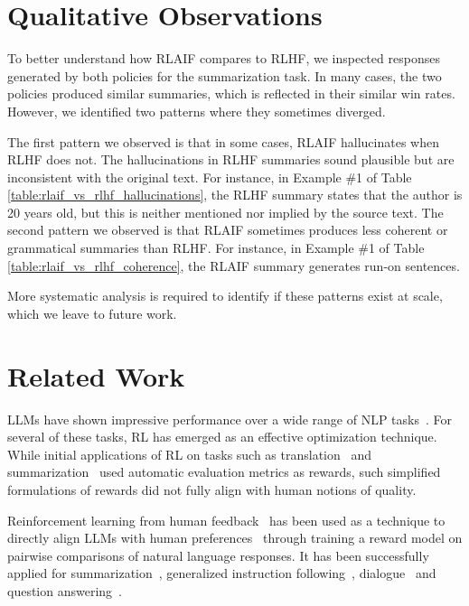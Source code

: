 \documentclass[11pt]{article}
\begin{document}
\section{Qualitative Observations}
\label{sec:analysis_rlaif_vs_rlhf}

To better understand how RLAIF compares to RLHF, we inspected responses generated by both policies for the summarization task. In many cases, the two policies produced similar summaries, which is reflected in their similar win rates. However, we identified two patterns where they sometimes diverged.

The first pattern we observed is that in some cases, RLAIF hallucinates when RLHF does not. The hallucinations in RLHF summaries sound plausible but are inconsistent with the original text. For instance, in Example \#1 of Table \ref{table:rlaif_vs_rlhf_hallucinations}, the RLHF summary states that the author is 20 years old, but this is neither mentioned nor implied by the source text. The second pattern we observed is that RLAIF sometimes produces less coherent or grammatical summaries than RLHF. For instance, in Example \#1 of Table \ref{table:rlaif_vs_rlhf_coherence}, the RLAIF summary generates run-on sentences.

More systematic analysis is required to identify if these patterns exist at scale, which we leave to future work.



\section{Related Work}
LLMs have shown impressive performance over a wide range of NLP tasks~\citep{brown2020language,thoppilan2022lamda,chowdhery2022palm,palm2,openai2023gpt4}. For several of these tasks, RL has emerged as an effective optimization technique. While initial applications of RL on tasks such as translation~\citep{wu2016google,wu2018study} and summarization~\citep{gao2019reward,wu2018learning} used automatic evaluation metrics as rewards, such simplified formulations of rewards did not fully align with human notions of quality. 

Reinforcement learning from human feedback~\citep{christiano2017deep} has been used as a technique to directly align LLMs with human preferences~\citep{ziegler2019fine} through training a reward model on pairwise comparisons of natural language responses. It has been successfully applied for summarization~\citep{stiennon2020learning}, generalized instruction following~\citep{ouyang2022training,lai2023okapi}, dialogue~\citep{gilardi2023chatgpt,bardoverview,glaese2022improving,bai2022training} and question answering~\citep{nakano2021webgpt}.
\end{document}
